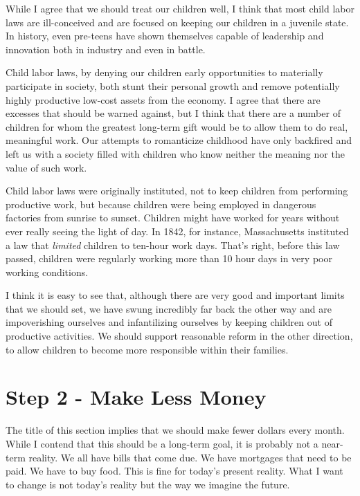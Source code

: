\begin{policynote}
While I agree that we should treat our children well, I think that most
child labor laws are ill-conceived and are focused on keeping our
children in a juvenile state. In history, even pre-teens have shown
themselves capable of leadership and innovation both in industry and
even in battle. 

Child labor laws, by denying our children early opportunities to
materially participate in society, both stunt their personal growth and
remove potentially highly productive low-cost assets from the economy.
I agree that there are excesses that should be warned against, but I
think that there are a number of children for whom the greatest
long-term gift would be to allow them to do real, meaningful work. Our
attempts to romanticize childhood have only backfired and left us with
a society filled with children who know neither the meaning nor the
value of such work.

Child labor laws were originally instituted, not to keep children from
performing productive work, but because children were being employed in
dangerous factories from sunrise to sunset. Children might
have
worked for years
without ever really seeing the light of day. In 1842, for instance,
Massachusetts instituted a law that \textit{limited} children to
ten-hour work days. That’s right, before this law passed, children were
regularly working more than 10 hour days in very poor working
conditions.

I think it is easy to see that, although there are very good and
important limits that we should set, we have swung incredibly far back
the other way and are impoverishing ourselves and infantilizing
ourselves by keeping children out of productive activities. We should
support reasonable reform in the other direction, to allow children to
become more responsible within their families. 
\end{policynote}

\section{Step 2 - Make Less Money}

The title of this section implies that we should make fewer dollars
every month. While I contend that this should be a long-term goal, it
is probably not a near-term reality. We all have bills that come due.
We have mortgages that need to be paid. We have to buy food. This is
fine for today’s present reality. What I want to change is not
today’s reality but
the way we imagine the future.

